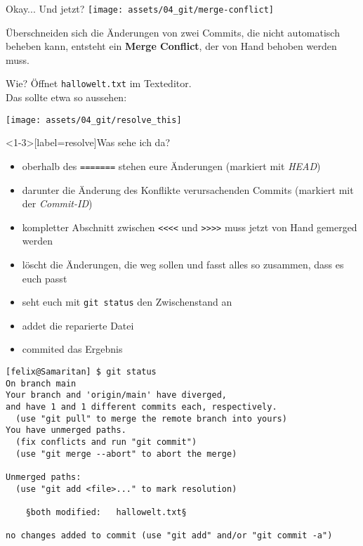 \begin{frame}{Okay... Und jetzt?}
	\centering \texttt{[image: assets/04\_git/merge-conflict]}
	\vfill

	Überschneiden sich die Änderungen von zwei Commits, die \git nicht automatisch beheben kann, entsteht ein \textbf{Merge Conflict}, der von Hand behoben werden muss.
\end{frame}

\begin{frame}{Wie?}
	\centering Öffnet \texttt{hallowelt.txt} im Texteditor. \\
	Das sollte etwa so aussehen:


	\pause{}
	\texttt{[image: assets/04\_git/resolve\_this]}
\end{frame}

\begin{frame}<1-3>[label=resolve]{Was sehe ich da?}
	\begin{itemize}
		\item oberhalb des \texttt{=======} stehen eure Änderungen (markiert mit \emph{HEAD})
		\item darunter die Änderung des Konflikte verursachenden Commits (markiert mit der \emph{Commit-ID})
	\end{itemize}

	\pause{}
	\begin{itemize}
		\item kompletter Abschnitt zwischen \texttt{<<<<} und \texttt{>>>>} muss jetzt von Hand gemerged werden
		\item löscht die Änderungen, die weg sollen und fasst alles so zusammen, dass es euch passt
		\item<3-> seht euch mit \texttt{git status} den Zwischenstand an
		\item<4-> addet die \glqq{}reparierte\grqq{} Datei
		\item<4-> commited das Ergebnis
	\end{itemize}
\end{frame}

\begin{frame}[fragile]
	\begin{lstlisting}
[felix@Samaritan] $ git status
On branch main
Your branch and 'origin/main' have diverged,
and have 1 and 1 different commits each, respectively.
  (use "git pull" to merge the remote branch into yours)
You have unmerged paths.
  (fix conflicts and run "git commit")
  (use "git merge --abort" to abort the merge)

Unmerged paths:
  (use "git add <file>..." to mark resolution)

    §both modified:   hallowelt.txt§

no changes added to commit (use "git add" and/or "git commit -a")
\end{lstlisting}
\end{frame}

